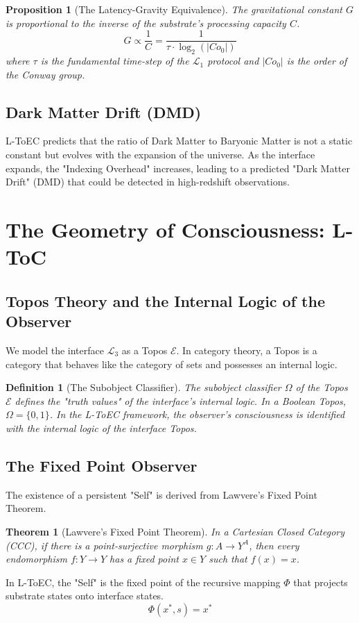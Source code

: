 \documentclass[11pt,onecolumn]{article}
\newcommand{\protocol}{\mathcal{L}_1}
\newcommand{\interface}{\mathcal{L}_3}
\newcommand{\conway}{Co_0}
\newcommand{\topos}{\mathcal{E}}
\newcommand{\classifier}{\Omega}
\newtheorem{theorem}{Theorem}
\newtheorem{proposition}{Proposition}
\newtheorem{definition}{Definition}
\begin{document}
\begin{proposition}[The Latency-Gravity Equivalence]
The gravitational constant $G$ is proportional to the inverse of the substrate's processing capacity $C$.
\begin{equation}
G \propto \frac{1}{C} = \frac{1}{\tau \cdot \log_2(|\conway|)}
\end{equation}
where $\tau$ is the fundamental time-step of the $\protocol$ protocol and $|\conway|$ is the order of the Conway group.
\end{proposition}

\subsection{Dark Matter Drift (DMD)}
L-ToEC predicts that the ratio of Dark Matter to Baryonic Matter is not a static constant but evolves with the expansion of the universe. As the interface expands, the "Indexing Overhead" increases, leading to a predicted "Dark Matter Drift" (DMD) that could be detected in high-redshift observations.

\section{The Geometry of Consciousness: L-ToC}

\subsection{Topos Theory and the Internal Logic of the Observer}
We model the interface $\interface$ as a Topos $\topos$. In category theory, a Topos is a category that behaves like the category of sets and possesses an internal logic.
\begin{definition}[The Subobject Classifier]
The subobject classifier $\classifier$ of the Topos $\topos$ defines the "truth values" of the interface's internal logic. In a Boolean Topos, $\classifier = \{0, 1\}$. In the L-ToEC framework, the observer's consciousness is identified with the internal logic of the interface Topos.
\end{definition}

\subsection{The Fixed Point Observer}
The existence of a persistent "Self" is derived from Lawvere's Fixed Point Theorem.
\begin{theorem}[Lawvere's Fixed Point Theorem]
In a Cartesian Closed Category (CCC), if there is a point-surjective morphism $g: A \to Y^A$, then every endomorphism $f: Y \to Y$ has a fixed point $x \in Y$ such that $f(x) = x$.
\end{theorem}
In L-ToEC, the "Self" is the fixed point of the recursive mapping $\Phi$ that projects substrate states onto interface states.
\begin{equation}
\Phi(x^*, s) = x^*
\end{equation}
\end{document}
